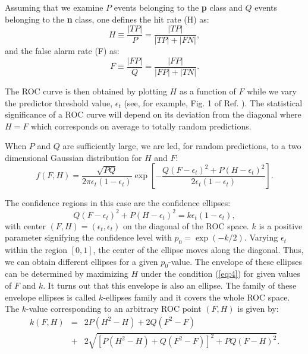 \documentclass[preprint,12pt]{elsarticle}
\begin{document}
Assuming that we examine $P$ events belonging to the {\bf p} class and $Q$ events belonging to the {\bf n} class, one defines\cite{FAW06} the hit rate (H) as: 
\begin{equation}\label{eq:1}
H\equiv\frac{|TP|}{P}=\frac{|TP|}{|TP|+|FN|},
\end{equation}
and the false alarm rate (F) as:
\begin{equation}\label{eq:2}
F\equiv\frac{|FP|}{Q}=\frac{|FP|}{|FP|+|TN|}.
\end{equation}

The ROC curve is then obtained by plotting $H$ as a function of $F$ while we vary the predictor threshold value, $\epsilon_t$ (see, for example, Fig. 1 of Ref. \cite{visroc1}). The statistical significance of a ROC curve will depend on its deviation from the diagonal where $H=F$ which corresponds on 
average to totally random predictions.

When $P$ and $Q$ are sufficiently large\cite{FEL71b}, we are led, for random predictions, to a
two dimensional Gaussian distribution for $H$ and $F$\cite{visroc1}:
\begin{equation}\label{eq:3}
f(F,H)=\frac{\sqrt{PQ}}{2\pi\epsilon_t
(1-\epsilon_t)}\exp\left[-\frac{Q(F-\epsilon_t)^2+P(H-\epsilon_t)^2}{2\epsilon_t
(1-\epsilon_t)}\right].
\end{equation} 

The confidence regions in this case\cite{BER12} are the confidence ellipses\cite{visroc1}:
\begin{equation}\label{eq:4}
{Q(F-\epsilon_t)^2+P(H-\epsilon_t)^2}=k{\epsilon_t (1-\epsilon_t)},
\end{equation} 
with center $(F,H)=(\epsilon_t,\epsilon_t)$ on the diagonal of
the ROC space. $k$ is a positive parameter signifying the confidence level
with $p_0=\exp(-k/2)$. Varying $\epsilon_t$ within the region $[0,1]$,
the center of the ellipse moves along the diagonal. Thus, we can obtain different
ellipses for a given $p_0$-value. The envelope of these ellipses can be
determined by maximizing $H$ under the condition (\ref{eq:4}) for given values of $F$ and $k$. It turns out that this envelope is also an ellipse. The family of these envelope ellipses is called\cite{visroc1} $k$-ellipses family and it covers the whole ROC space. The $k$-value corresponding to an arbitrary ROC point $(F,H)$ is given by\cite{visroc1}:
\begin{eqnarray}\label{eq:5}
k(F,H)&=&2P(H^2-H)+2Q(F^2-F) \nonumber \\
&+&2\sqrt{[P(H^2-H)+Q(F^2-F)]^2+PQ(F-H)^2}.
\end{eqnarray}
\end{document}
